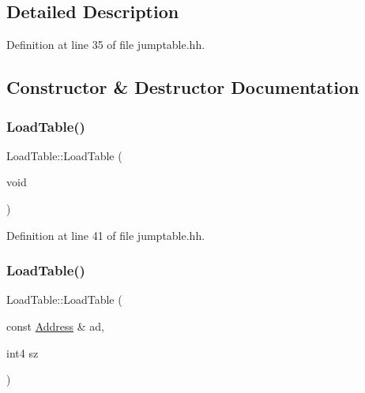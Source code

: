 \subsection{Detailed Description}


Definition at line 35 of file jumptable.\+hh.



\subsection{Constructor \& Destructor Documentation}
\mbox{\label{class_load_table_a799c6dbf6e0efb106c3af5b6e3dd42cc}} 
\subsubsection{\texorpdfstring{LoadTable()}{LoadTable()}\hspace{0.1cm}{\footnotesize\ttfamily [1/3]}}
{\footnotesize\ttfamily Load\+Table\+::\+Load\+Table (\begin{DoxyParamCaption}\item[{void}]{ }\end{DoxyParamCaption})\hspace{0.3cm}{\ttfamily [inline]}}



Definition at line 41 of file jumptable.\+hh.

\mbox{\label{class_load_table_ab1853a08a32ffe8587514b580218f62d}} 
\subsubsection{\texorpdfstring{LoadTable()}{LoadTable()}\hspace{0.1cm}{\footnotesize\ttfamily [2/3]}}
{\footnotesize\ttfamily Load\+Table\+::\+Load\+Table (\begin{DoxyParamCaption}\item[{const \mbox{\hyperlink{class_address}{Address}} \&}]{ad,  }\item[{int4}]{sz }\end{DoxyParamCaption})\hspace{0.3cm}{\ttfamily [inline]}}



